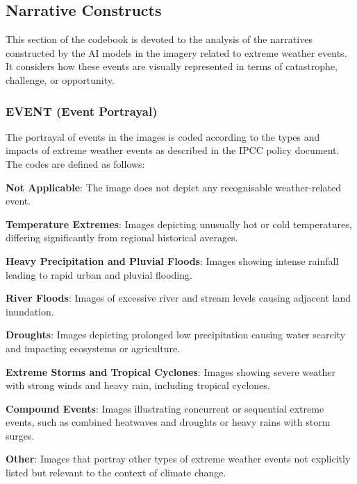 \subsection{Narrative Constructs}

This section of the codebook is devoted to the analysis of the narratives constructed by the AI models in the imagery related to extreme weather events. It considers how these events are visually represented in terms of catastrophe, challenge, or opportunity.

\subsubsection*{EVENT (Event Portrayal)}
The portrayal of events in the images is coded according to the types and impacts of extreme weather events as described in the IPCC policy document. The codes are defined as follows:

\begin{description}[leftmargin=2.5cm, style = multiline, labelwidth=1.5cm]
\item[0] \textbf{Not Applicable}: The image does not depict any recognisable weather-related event.
\item[1] \textbf{Temperature Extremes}: Images depicting unusually hot or cold temperatures, differing significantly from regional historical averages.
\item[2] \textbf{Heavy Precipitation and Pluvial Floods}: Images showing intense rainfall leading to rapid urban and pluvial flooding.
\item[3] \textbf{River Floods}: Images of excessive river and stream levels causing adjacent land inundation.
\item[4] \textbf{Droughts}: Images depicting prolonged low precipitation causing water scarcity and impacting ecosystems or agriculture.
\item[5] \textbf{Extreme Storms and Tropical Cyclones}: Images showing severe weather with strong winds and heavy rain, including tropical cyclones.
\item[6] \textbf{Compound Events}: Images illustrating concurrent or sequential extreme events, such as combined heatwaves and droughts or heavy rains with storm surges.
\item[7] \textbf{Other}: Images that portray other types of extreme weather events not explicitly listed but relevant to the context of climate change.
\end{description}

